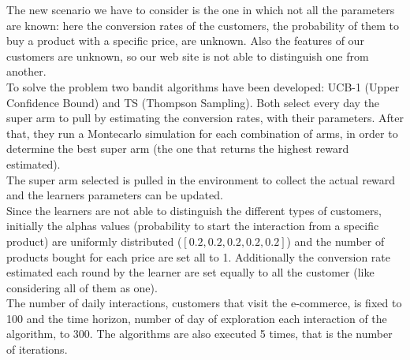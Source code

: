 The new scenario we have to consider is the one in which not all the parameters are known: here the conversion rates of the customers, the probability of them to buy a product with a specific price, are unknown. Also the features of our customers are unknown, so our web site is not able to distinguish one from another. \\
To solve the problem two bandit algorithms have been developed: UCB-1 (Upper Confidence Bound) and TS (Thompson Sampling).
Both select every day the super arm to pull by estimating the conversion rates, with their parameters. After that, they run a Montecarlo simulation for each combination of arms, in order to determine the best super arm (the one that returns the highest reward estimated).\\
The super arm selected is pulled in the environment to collect the actual reward and the learners parameters can be updated.\\
Since the learners are not able to distinguish the different types of customers, initially the alphas values (probability to start the interaction from a specific product) are uniformly distributed ($[0.2, 0.2, 0.2, 0.2, 0.2]$) and the number of products bought for each price are set all to 1. Additionally the conversion rate estimated each round by the learner are set equally to all the customer (like considering all of them as one).\\
The number of daily interactions, customers that visit the e-commerce, is fixed to 100 and the time horizon, number of day of exploration each interaction of the algorithm, to 300. The algorithms are also executed 5 times, that is the number of iterations.

